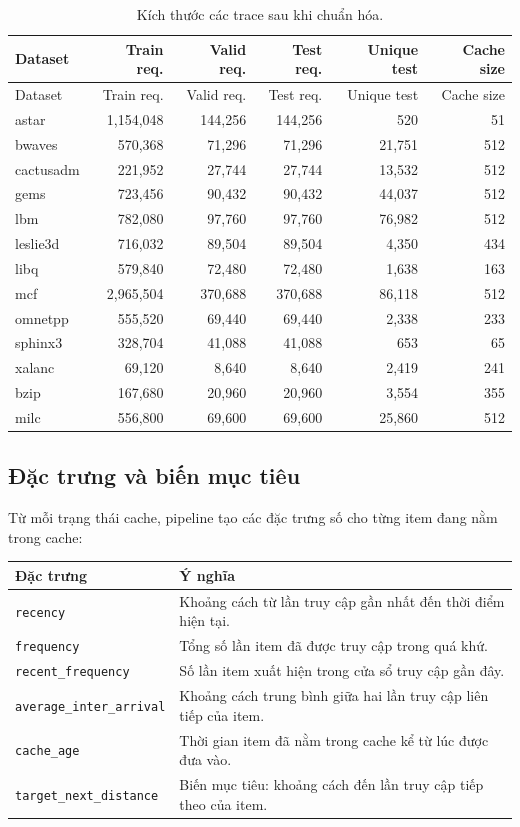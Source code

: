 \documentclass[11pt,a4paper]{article}
\newcommand{\code}[1]{\texttt{#1}}
\begin{document}
\begin{longtable}{lrrrrr}
\caption{Kích thước các trace sau khi chuẩn hóa.}\\
\toprule
Dataset & Train req. & Valid req. & Test req. & Unique test & Cache size \\
\midrule
\endfirsthead
\toprule
Dataset & Train req. & Valid req. & Test req. & Unique test & Cache size \\
\midrule
\endhead
astar & 1,154,048 & 144,256 & 144,256 & 520 & 51 \\
bwaves & 570,368 & 71,296 & 71,296 & 21,751 & 512 \\
cactusadm & 221,952 & 27,744 & 27,744 & 13,532 & 512 \\
gems & 723,456 & 90,432 & 90,432 & 44,037 & 512 \\
lbm & 782,080 & 97,760 & 97,760 & 76,982 & 512 \\
leslie3d & 716,032 & 89,504 & 89,504 & 4,350 & 434 \\
libq & 579,840 & 72,480 & 72,480 & 1,638 & 163 \\
mcf & 2,965,504 & 370,688 & 370,688 & 86,118 & 512 \\
omnetpp & 555,520 & 69,440 & 69,440 & 2,338 & 233 \\
sphinx3 & 328,704 & 41,088 & 41,088 & 653 & 65 \\
xalanc & 69,120 & 8,640 & 8,640 & 2,419 & 241 \\
bzip & 167,680 & 20,960 & 20,960 & 3,554 & 355 \\
milc & 556,800 & 69,600 & 69,600 & 25,860 & 512 \\
\bottomrule
\end{longtable}

\subsection{Đặc trưng và biến mục tiêu}

Từ mỗi trạng thái cache, pipeline tạo các đặc trưng số cho từng item đang nằm trong cache:

\begin{tabularx}{\textwidth}{lX}
\toprule
Đặc trưng & Ý nghĩa \\
\midrule
\code{recency} & Khoảng cách từ lần truy cập gần nhất đến thời điểm hiện tại. \\
\code{frequency} & Tổng số lần item đã được truy cập trong quá khứ. \\
\code{recent\_frequency} & Số lần item xuất hiện trong cửa sổ truy cập gần đây. \\
\code{average\_inter\_arrival} & Khoảng cách trung bình giữa hai lần truy cập liên tiếp của item. \\
\code{cache\_age} & Thời gian item đã nằm trong cache kể từ lúc được đưa vào. \\
\code{target\_next\_distance} & Biến mục tiêu: khoảng cách đến lần truy cập tiếp theo của item. \\
\bottomrule
\end{tabularx}
\end{document}
